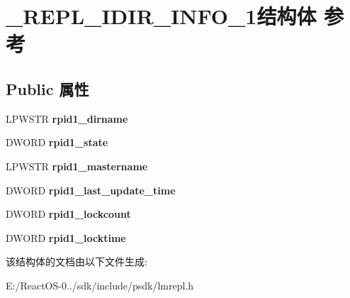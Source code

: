 \hypertarget{struct___r_e_p_l___i_d_i_r___i_n_f_o__1}{}\section{\+\_\+\+R\+E\+P\+L\+\_\+\+I\+D\+I\+R\+\_\+\+I\+N\+F\+O\+\_\+1结构体 参考}
\label{struct___r_e_p_l___i_d_i_r___i_n_f_o__1}
\subsection*{Public 属性}
\begin{DoxyCompactItemize}
\item 
\mbox{\label{struct___r_e_p_l___i_d_i_r___i_n_f_o__1_a25087eeaae74a0c31ce81a269ba6b2d8}} 
L\+P\+W\+S\+TR {\bfseries rpid1\+\_\+dirname}
\item 
\mbox{\label{struct___r_e_p_l___i_d_i_r___i_n_f_o__1_af9a204621fa831ed682f163abe210af0}} 
D\+W\+O\+RD {\bfseries rpid1\+\_\+state}
\item 
\mbox{\label{struct___r_e_p_l___i_d_i_r___i_n_f_o__1_abbc86903f78efb678044eafe834501b1}} 
L\+P\+W\+S\+TR {\bfseries rpid1\+\_\+mastername}
\item 
\mbox{\label{struct___r_e_p_l___i_d_i_r___i_n_f_o__1_a005af3765db384d43a4a5c2eecbb4e47}} 
D\+W\+O\+RD {\bfseries rpid1\+\_\+last\+\_\+update\+\_\+time}
\item 
\mbox{\label{struct___r_e_p_l___i_d_i_r___i_n_f_o__1_a2211cbc214aeee7d663284e0f9650d32}} 
D\+W\+O\+RD {\bfseries rpid1\+\_\+lockcount}
\item 
\mbox{\label{struct___r_e_p_l___i_d_i_r___i_n_f_o__1_a1e7c2092d850dc91300669f16ce7f934}} 
D\+W\+O\+RD {\bfseries rpid1\+\_\+locktime}
\end{DoxyCompactItemize}


该结构体的文档由以下文件生成\+:\begin{DoxyCompactItemize}
\item 
E\+:/\+React\+O\+S-\/0../sdk/include/psdk/lmrepl.\+h\end{DoxyCompactItemize}
